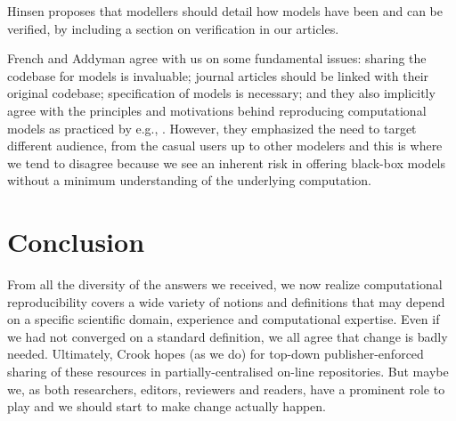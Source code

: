 \documentclass[jou]{apa6}
\begin{document}
Hinsen proposes that modellers should detail how models have been and can be verified, by including a section on verification in our articles.

French and Addyman agree with us on some fundamental issues: sharing the codebase for models is invaluable; journal articles should be linked with their original codebase; specification of models is necessary; and they also implicitly agree with the principles and motivations behind reproducing computational models as practiced by e.g., . However, they
emphasized the need to target different audience, from the casual users up to other modelers and this is where we tend to disagree because we see an inherent risk in offering black-box models without a minimum understanding of the underlying computation.


\section{Conclusion}

From all the diversity of the answers we received, we now realize computational reproducibility covers a wide variety of notions and definitions that may depend on a specific scientific domain,  experience and computational expertise. 
Even if we had not converged on a standard definition, we all agree that change is badly needed.
Ultimately, Crook hopes (as we do) for top-down publisher-enforced sharing of these resources in partially-centralised on-line repositories.
But maybe we, as both researchers, editors, reviewers and readers, have a prominent role to play and we should start to make change actually happen.



\end{document}
